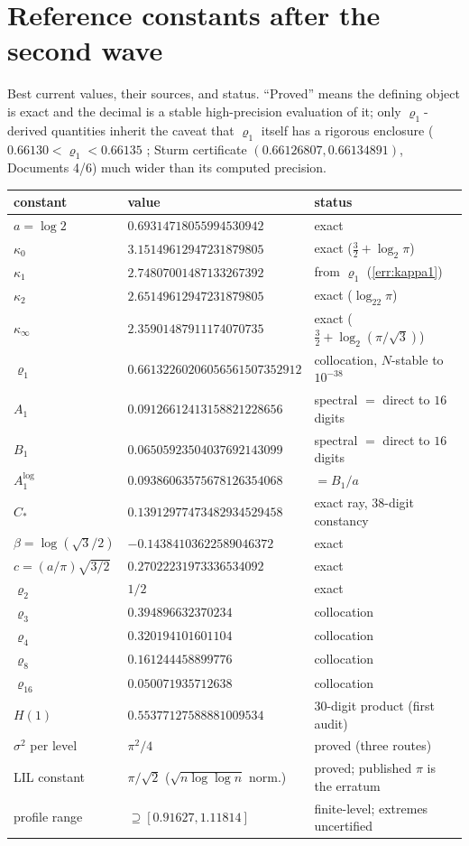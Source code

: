 \documentclass[11pt,oneside]{article}
\theoremstyle{definition}
\theoremstyle{remark}
\begin{document}
\appendix

\section{Reference constants after the second wave}
\label{app:constants}

Best current values, their sources, and status.  ``Proved'' means the
defining object is exact and the decimal is a stable high-precision
evaluation of it; only $\varrho_1$-derived quantities inherit the
caveat that $\varrho_1$ itself has a rigorous enclosure
($0.66130<\varrho_1<0.66135$ \cite{ahl2017}; Sturm certificate
$(0.66126807,0.66134891)$, Documents 4/6) much wider than its computed
precision.

\begin{center}
\small
\begin{tabular}{@{}lll@{}}
\toprule
constant & value & status \\
\midrule
$a=\log2$ & $0.69314718055994530942$ & exact \\
$\kappa_0$ & $3.15149612947231879805$ & exact ($\tfrac32+\log_2\pi$) \\
$\kappa_1$ & $2.74807001487133267392$ & from $\varrho_1$ (\cref{err:kappa1}) \\
$\kappa_2$ & $2.65149612947231879805$ & exact ($\log_22\pi$) \\
$\kappa_\infty$ & $2.35901487911174070735$ & exact ($\tfrac32+\log_2(\pi/\sqrt3)$) \\
$\varrho_1$ & $0.66132260206056561507352912$ & collocation, $N$-stable to $10^{-38}$ \\
$A_1$ & $0.09126612413158821228656$ & spectral $=$ direct to $16$ digits \\
$B_1$ & $0.06505923504037692143099$ & spectral $=$ direct to $16$ digits \\
$A_1^{\log}$ & $0.09386063575678126354068$ & $=B_1/a$ \\
$C_*$ & $0.13912977473482934529458$ & exact ray, $38$-digit constancy \\
$\beta=\log(\sqrt3/2)$ & $-0.14384103622589046372$ & exact \\
$c=(a/\pi)\sqrt{3/2}$ & $0.27022231973336534092$ & exact \\
$\varrho_2$ & $1/2$ & exact \\
$\varrho_3$ & $0.394896632370234$ & collocation \\
$\varrho_4$ & $0.320194101601104$ & collocation \\
$\varrho_8$ & $0.161244458899776$ & collocation \\
$\varrho_{16}$ & $0.050071935712638$ & collocation \\
$H(1)$ & $0.55377127588881009534$ & 30-digit product (first audit) \\
$\sigma^2$ per level & $\pi^2/4$ & proved (three routes) \\
LIL constant & $\pi/\sqrt2$ ($\sqrt{n\log\log n}$ norm.) & proved; published $\pi$ is the erratum \\
profile range & $\supseteq[0.91627,1.11814]$ & finite-level; extremes uncertified \\
\bottomrule
\end{tabular}
\end{center}
\end{document}
